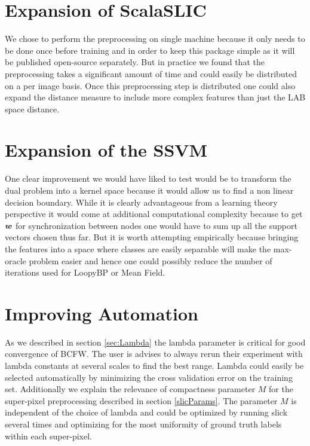 \section{Expansion of ScalaSLIC}
We chose to perform the preprocessing on single machine because it only needs to be done once before training and in order to keep this package simple as it will be published open-source separately. But in practice we found that the preprocessing takes a significant amount of time and could easily be distributed on a per image basis. Once this preprocessing step is distributed one could also expand the distance measure to include more complex features than just the LAB space distance. 
\section{Expansion of the SSVM}
One clear improvement we would have liked to test would be to transform the dual problem into a kernel space because it would allow us to find a non linear decision boundary. While it is clearly advantageous from a learning theory perspective it would come at additional computational complexity because to get $\bm{w}$ for synchronization between nodes one would have to sum up all the support vectors chosen thus far. But it is worth attempting empirically because bringing the features into a space where classes are easily separable will make the max-oracle problem easier and hence one could possibly reduce the number of iterations used for LoopyBP or Mean Field. 
\section{Improving Automation}
As we described in section \ref{sec:Lambda} the lambda parameter is critical for good convergence of BCFW. The user is advises to always rerun their experiment with lambda constants at several scales to find the best range. Lambda could easily be selected automatically by minimizing the cross validation error on the training set. Additionally we explain the relevance of compactness parameter $M$ for the super-pixel preprocessing described in section \ref{slicParams}. The parameter $M$ is independent of the choice of lambda and could be optimized by running slick several times and optimizing for the most uniformity of ground truth labels within each super-pixel. 

